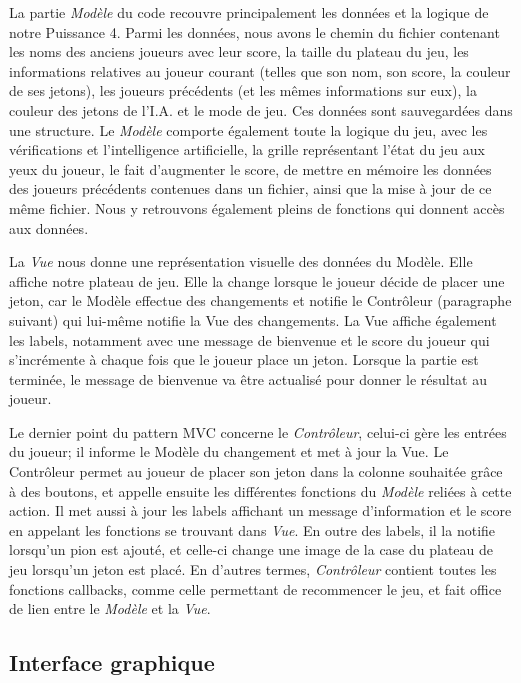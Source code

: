 \documentclass[a4paper, 11pt, oneside]{article}
\begin{document}
La partie \emph{Modèle} du code recouvre principalement les données et la logique de notre Puissance 4. Parmi les données, nous avons le chemin du fichier contenant les noms des anciens joueurs avec leur score, la taille du plateau du jeu, les informations relatives au joueur courant (telles que son nom, son score, la couleur de ses jetons), les joueurs précédents (et les mêmes informations sur eux), la couleur des jetons de l'I.A. et le mode de jeu. Ces données sont sauvegardées dans une structure. Le \emph{Modèle} comporte également toute la logique du jeu, avec les vérifications et l'intelligence artificielle, la grille représentant l'état du jeu aux yeux du joueur, le fait d'augmenter le score, de mettre en mémoire les données des joueurs précédents contenues dans un fichier, ainsi que la mise à jour de ce même fichier. Nous y retrouvons également pleins de fonctions qui donnent accès aux données.

La \emph{Vue} nous donne une représentation visuelle des données du Modèle. Elle affiche notre plateau de jeu. Elle la change lorsque le joueur décide de placer une jeton, car le Modèle effectue des changements et notifie le Contrôleur (paragraphe suivant) qui lui-même notifie la Vue des changements. La Vue affiche également les labels, notamment avec une message de bienvenue et le score du joueur qui s'incrémente à chaque fois que le joueur place un jeton. Lorsque la partie est terminée, le message de bienvenue va être actualisé pour donner le résultat au joueur.

Le dernier point du pattern MVC concerne le \emph{Contrôleur}, celui-ci gère les entrées du joueur; il informe le Modèle du changement et met à jour la Vue. Le Contrôleur permet au joueur de placer son jeton dans la colonne souhaitée grâce à des boutons, et appelle ensuite les différentes fonctions du \emph{Modèle} reliées à cette action. Il met aussi à jour les labels affichant un message d'information et le score en appelant les fonctions se trouvant dans \emph{Vue}. En outre des labels, il la notifie lorsqu'un pion est ajouté, et celle-ci change une image de la case du plateau de jeu lorsqu'un jeton est placé. En d'autres termes, \emph{Contrôleur} contient toutes les fonctions callbacks, comme celle permettant de recommencer le jeu, et fait office de lien entre le \emph{Modèle} et la \emph{Vue}.

\subsection{Interface graphique}
\end{document}
